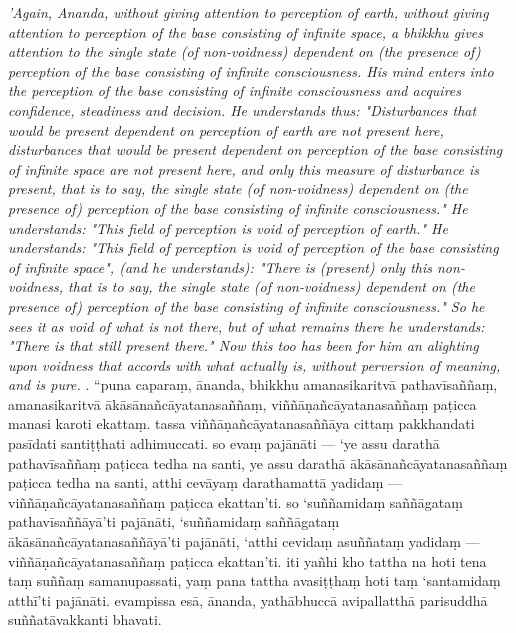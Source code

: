 \documentclass[10pt]{article}
\begin{document}
\begin{paracol}{2}
\begin{column}
{\itshape\footnotesize 'Again, Ananda, without giving attention to perception of earth, without giving attention to perception of the base consisting of infinite space, a bhikkhu gives attention to the single state (of non-voidness) dependent on (the presence of) perception of the base consisting of infinite consciousness. His mind enters into the perception of the base consisting of infinite consciousness and acquires confidence, steadiness and decision. He understands thus: "Disturbances that would be present dependent on perception of earth are not present here, disturbances that would be present dependent on perception of the base consisting of infinite space are not present here, and only this measure of disturbance is present, that is to say, the single state (of non-voidness) dependent on (the presence of) perception of the base consisting of infinite consciousness." He understands: "This field of perception is void of perception of earth." He understands: "This field of perception is void of perception of the base consisting of infinite space", (and he understands): "There is (present) only this non-voidness, that is to say, the single state (of non-voidness) dependent on (the presence of) perception of the base consisting of infinite consciousness." So he sees it as void of what is not there, but of what remains there he understands: "There is that still present there." Now this too has been for him an alighting upon voidness that accords with what actually is, without perversion of meaning, and is pure.}
. “puna caparaṃ, ānanda, bhikkhu amanasikaritvā pathavīsaññaṃ, amanasikaritvā ākāsānañcāyatanasaññaṃ, viññāṇañcāyatanasaññaṃ paṭicca manasi karoti ekattaṃ. tassa viññāṇañcāyatanasaññāya cittaṃ pakkhandati pasīdati santiṭṭhati adhimuccati. so evaṃ pajānāti — ‘ye assu darathā pathavīsaññaṃ paṭicca tedha na santi, ye assu darathā ākāsānañcāyatanasaññaṃ paṭicca tedha na santi, atthi cevāyaṃ darathamattā yadidaṃ — viññāṇañcāyatanasaññaṃ paṭicca ekattan’ti. so ‘suññamidaṃ saññāgataṃ pathavīsaññāyā’ti pajānāti, ‘suññamidaṃ saññāgataṃ ākāsānañcāyatanasaññāyā’ti pajānāti, ‘atthi cevidaṃ asuññataṃ yadidaṃ — viññāṇañcāyatanasaññaṃ paṭicca ekattan’ti. iti yañhi kho tattha na hoti tena taṃ suññaṃ samanupassati, yaṃ pana tattha avasiṭṭhaṃ hoti taṃ ‘santamidaṃ atthī’ti pajānāti. evampissa esā, ānanda, yathābhuccā avipallatthā parisuddhā suññatāvakkanti bhavati.
\switchcolumn*

\end{column}
\end{paracol}
\end{document}
